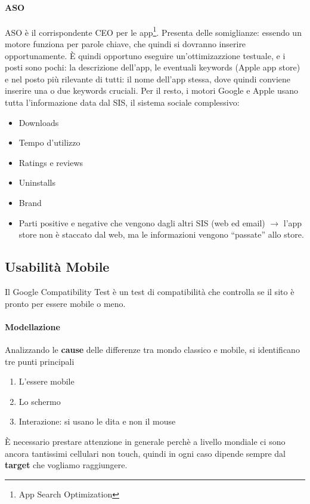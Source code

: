 \paragraph*{ASO}ASO \`e il corrispondente CEO per le app\footnote{App Search Optimization}. Presenta delle somiglianze: essendo un motore funziona per parole chiave, che quindi si dovranno inserire opportunamente. \`E quindi opportuno eseguire un'ottimizazzione testuale, e i posti sono pochi: la descrizione dell'app, le eventuali keywords (Apple app store) e nel posto pi\`u rilevante di tutti: il nome dell'app stessa, dove quindi conviene inserire una o due keywords cruciali. Per il resto, i motori Google e Apple usano tutta l'informazione data dal SIS, il sistema sociale complessivo:
\begin{itemize}

\item Downloads
\item Tempo d'utilizzo
\item Ratings e reviews
\item Uninstalls
\item Brand
\item Parti positive e negative che vengono dagli altri SIS (web ed email) $\to$ l'app store non \`e staccato dal web, ma le informazioni vengono ``passate'' allo store.
  
\end{itemize}

\subsection{Usabilit\`a Mobile}

Il Google Compatibility Test \`e un test di compatibilit\`a che controlla se il sito \`e pronto per essere mobile o meno.

\paragraph*{Modellazione}Analizzando le \textbf{cause} delle differenze tra mondo classico e mobile, si identificano tre punti principali
\begin{enumerate}
  
\item L'essere mobile
\item Lo schermo
\item Interazione: si usano le dita e non il mouse
  
\end{enumerate}
\`E necessario prestare attenzione in generale perch\`e a livello mondiale ci sono ancora tantissimi cellulari non touch, quindi in ogni caso dipende sempre dal \textbf{target} che vogliamo raggiungere.


